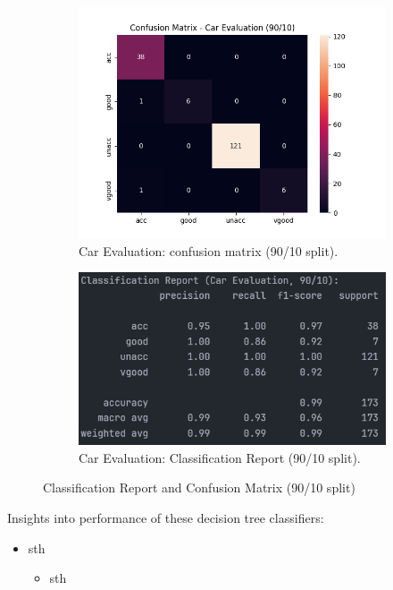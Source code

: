 \begin{figure}[H]
	\centering
	\begin{subfigure}{0.45\textwidth}
		\centering
		\includegraphics[width=\textwidth]{imgs/confusion_mat/confusion_mat__car_evaluation__90_vs_10.png}
		\caption{Car Evaluation: confusion matrix (90/10 split).}\label{fig:ce-cm-90-10}
	\end{subfigure}
	\hfill
	\begin{subfigure}{0.45\textwidth}
		\centering
		\includegraphics[width=\textwidth]{imgs/confusion_mat/class_rp__car_evaluation__90_vs_10.png}
		\caption{Car Evaluation: Classification Report (90/10 split).}\label{fig:ce-cr-90-10}
	\end{subfigure}

	\caption{Classification Report and Confusion Matrix (90/10 split)}\label{fig:ce-eval-90-10}
\end{figure}
\begin{flushleft}
	Insights into performance of these decision tree classifiers:
	\begin{itemize}
		\item sth
		      \begin{itemize}
			      \item sth
		      \end{itemize}
	\end{itemize}
\end{flushleft}

